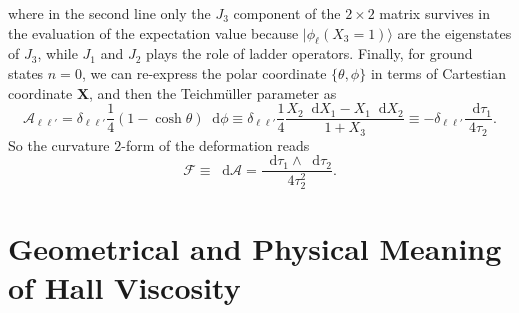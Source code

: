 \documentclass[10pt,nofootinbib,letterpaper]{revtex4}
\newcommand*\dd{\mathop{}\!\mathrm{d}}
\begin{document}
		where in the second line only the $J_3$ component of the $2\times2$ matrix survives in the evaluation of the expectation value because $|\phi_\ell(X_3=1)\rangle$ are the eigenstates of $J_3$, while $J_1$ and $J_2$ plays the role of ladder operators. Finally, for ground states $n=0$, we can re-express the polar coordinate $\{\theta,\phi\}$ in terms of Cartestian coordinate $\bm{X}$, and then the Teichm\"{u}ller parameter as
		\begin{equation}\label{2.3.6}
			\mathcal{A}_{\ell\ell'}=\delta_{\ell\ell'}\dfrac{1}{4}(1-\cosh\theta)\dd\phi\equiv\delta_{\ell\ell'}\dfrac{1}{4}\dfrac{X_2\dd X_1-X_1\dd X_2}{1+X_3}\equiv-\delta_{\ell\ell'}\dfrac{\dd\tau_1}{4\tau_2}.
		\end{equation}
		So the curvature $2$-form of the deformation reads
		\begin{equation}\label{2.3.7}
			\mathcal{F}\equiv \dd\mathcal{A}=\dfrac{\dd\tau_1\wedge\dd\tau_2}{4\tau_2^2}.
		\end{equation}

\section{Geometrical and Physical Meaning of Hall Viscosity}
\end{document}
